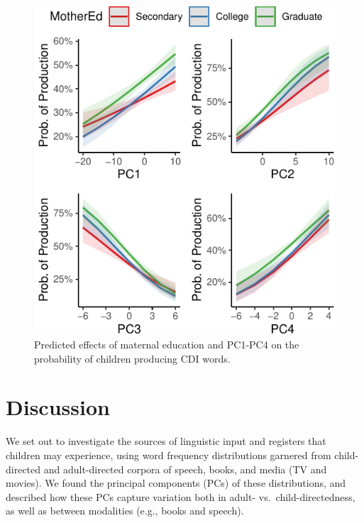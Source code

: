 \documentclass[10pt, letterpaper]{article}
\newenvironment{CodeChunk}{}{}
\begin{document}
\begin{CodeChunk}
\begin{figure}[H]

{\centering \includegraphics{figs/unnamed-chunk-7-1} 

}

\caption[Predicted effects of maternal education and PC1-PC4 on the probability of children producing CDI words]{Predicted effects of maternal education and PC1-PC4 on the probability of children producing CDI words.}\label{fig:unnamed-chunk-7}
\end{figure}
\end{CodeChunk}

\hypertarget{discussion}{%
\section{Discussion}\label{discussion}}

We set out to investigate the sources of linguistic input and registers
that children may experience, using word frequency distributions
garnered from child-directed and adult-directed corpora of speech,
books, and media (TV and movies). We found the principal components
(PCs) of these distributions, and described how these PCs capture
variation both in adult- vs.~child-directedness, as well as between
modalities (e.g., books and speech).
\end{document}
